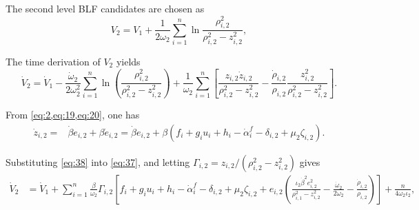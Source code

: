 \documentclass[pdflatex,sn-mathphys-num]{sn-jnl}%
\theoremstyle{thmstyleone}%
\theoremstyle{thmstyletwo}%
\theoremstyle{thmstylethree}%
\begin{document}
The second level BLF candidates are chosen as
\begin{equation}	\label{eq:36}
	V_2=V_1+\frac{1}{2 \omega_2}\sum_{i=1}^{n} \ln\frac{\rho_{i,2}^2}{\rho_{i,2}^2-z_{i,2}^2}, 
\end{equation}

The time derivation of $V_2$ yields
\begin{equation}\label{eq:37}
	\dot{V}_{2} = \dot{V}_{1}-\frac{\dot{\omega}_{2}}{2 \omega_{2}^{2}}\sum_{i=1}^{n}\ln\left(\frac{\rho_{i,2}^{2}}{\rho_{i,2}^{2}-z_{i,2}^{2}}\right)+\frac{1}{\omega_{2}}\sum_{i=1}^{n} \left[ \frac{z_{i,2} \dot{z}_{i,2}}{\rho_{i,2}^{2} - z_{i,2}^{2}} - \frac{\dot{\rho}_{i,2}}{\rho_{i,2}} \frac{z_{i,2}^{2}}{\rho_{i,2}^{2} - z_{i,2}^{2}} \right].
	\end{equation}
	
From \cref{eq:2,eq:19,eq:20}, one has 
	\begin{equation}\label{eq:38}
		\begin{aligned}
	\dot{z}_{i,2} =& \dot{\beta} e_{i,2} + \beta \dot{e}_{i,2}
	 =\dot{\beta} e_{i,2} + \beta \left(f_i + g_i u_i + h_i-\dot{\alpha}^{f}_{i}-\delta_{i,2}+\mu_2 \zeta_{i,2}\right).
\end{aligned}
	\end{equation}

Substituting \cref{eq:38} into \cref{eq:37}, and letting $\varGamma_{{i,2}}  ={z_{i,2}}/({\rho_{{i,2}}^2 - z_{i,2}^2})$ gives
\begin{equation}\label{eq:39}
	\begin{aligned}
		\dot V_2
		 & =\dot{V}_{1}+ \sum_{i=1}^n \frac{\beta}{\omega_{2}} \varGamma_{{i,2}}  \left[f_i + g_i u_i + h_i-\dot{\alpha}^{f}_{i}-\delta_{i,2} +\mu_2 \zeta_{i,2} +e_{i,2}\left(\frac{\iota_2  \dot{\beta}^{2} e_{i,2}^{2}}{\rho_{i,1}^{2} - z_{i,2}^{2}} -\frac{\dot{\omega}_{2}}{2 \omega_{2}}  -\frac{\dot{\rho}_{i,2}}{\rho_{{i,2}}}\right) \right]+\frac{n}{4 \omega_{2} \iota_2},
	\end{aligned}
\end{equation}
\end{document}
